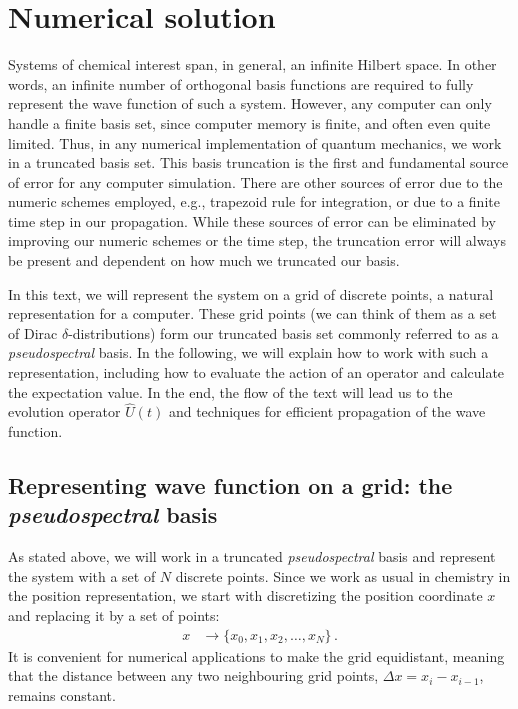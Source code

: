 \section{Numerical solution}

Systems of chemical interest span, in general, an infinite Hilbert space. In other words, an infinite number of orthogonal basis functions are required to fully represent the wave function of such a system. However, any computer can only handle a finite basis set, since computer memory is finite, and often even quite limited. Thus, in any numerical implementation of quantum mechanics, we work in a truncated basis set. This basis truncation is the first and fundamental source of error for any computer simulation. There are other sources of error due to the numeric schemes employed, e.g., trapezoid rule for integration, or due to a finite time step in our propagation. While these sources of error can be eliminated by improving our numeric schemes or the time step, the truncation error will always be present and dependent on how much we truncated our basis.

In this text, we will represent the system on a grid of discrete points, a natural representation for a computer. These grid points (we can think of them as a set of Dirac $\delta$-distributions) form our truncated basis set commonly referred to as a \textit{pseudospectral} basis. 
In the following, we will explain how to work with such a representation, including how to evaluate the action of an operator and calculate the expectation value. In the end, the flow of the text will lead us to the evolution operator $\hat{U}(t)$ and techniques for efficient propagation of the wave function.

\subsection{Representing wave function on a grid: the \textit{pseudospectral} basis}

As stated above, we will work in a truncated \textit{pseudospectral} basis and represent the system with a set of $N$ discrete points. Since we work as usual in chemistry in the position representation, we start with discretizing the position coordinate $x$ and replacing it by a set of points:
\begin{align}
    x &\rightarrow \{x_0, x_1, x_2, \dots, x_N\} \, .
\end{align}
It is convenient for numerical applications to make the grid equidistant, meaning that the distance between any two neighbouring grid points, $\Delta x = x_i - x_{i-1}$, remains constant. 

